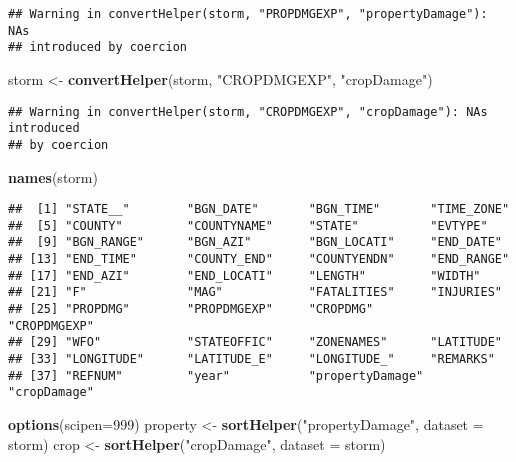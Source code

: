 \documentclass[]{article}
\newenvironment{Shaded}{\begin{snugshade}}{\end{snugshade}}
\newcommand{\KeywordTok}[1]{\textcolor[rgb]{0.13,0.29,0.53}{\textbf{#1}}}
\newcommand{\DataTypeTok}[1]{\textcolor[rgb]{0.13,0.29,0.53}{#1}}
\newcommand{\DecValTok}[1]{\textcolor[rgb]{0.00,0.00,0.81}{#1}}
\newcommand{\StringTok}[1]{\textcolor[rgb]{0.31,0.60,0.02}{#1}}
\newcommand{\NormalTok}[1]{#1}
\begin{document}
\begin{verbatim}
## Warning in convertHelper(storm, "PROPDMGEXP", "propertyDamage"): NAs
## introduced by coercion
\end{verbatim}

\begin{Shaded}
\begin{Highlighting}[]
\NormalTok{storm <-}\StringTok{ }\KeywordTok{convertHelper}\NormalTok{(storm, }\StringTok{"CROPDMGEXP"}\NormalTok{, }\StringTok{"cropDamage"}\NormalTok{)}
\end{Highlighting}
\end{Shaded}

\begin{verbatim}
## Warning in convertHelper(storm, "CROPDMGEXP", "cropDamage"): NAs introduced
## by coercion
\end{verbatim}

\begin{Shaded}
\begin{Highlighting}[]
\KeywordTok{names}\NormalTok{(storm)}
\end{Highlighting}
\end{Shaded}

\begin{verbatim}
##  [1] "STATE__"        "BGN_DATE"       "BGN_TIME"       "TIME_ZONE"     
##  [5] "COUNTY"         "COUNTYNAME"     "STATE"          "EVTYPE"        
##  [9] "BGN_RANGE"      "BGN_AZI"        "BGN_LOCATI"     "END_DATE"      
## [13] "END_TIME"       "COUNTY_END"     "COUNTYENDN"     "END_RANGE"     
## [17] "END_AZI"        "END_LOCATI"     "LENGTH"         "WIDTH"         
## [21] "F"              "MAG"            "FATALITIES"     "INJURIES"      
## [25] "PROPDMG"        "PROPDMGEXP"     "CROPDMG"        "CROPDMGEXP"    
## [29] "WFO"            "STATEOFFIC"     "ZONENAMES"      "LATITUDE"      
## [33] "LONGITUDE"      "LATITUDE_E"     "LONGITUDE_"     "REMARKS"       
## [37] "REFNUM"         "year"           "propertyDamage" "cropDamage"
\end{verbatim}

\begin{Shaded}
\begin{Highlighting}[]
\KeywordTok{options}\NormalTok{(}\DataTypeTok{scipen=}\DecValTok{999}\NormalTok{)}
\NormalTok{property <-}\StringTok{ }\KeywordTok{sortHelper}\NormalTok{(}\StringTok{"propertyDamage"}\NormalTok{, }\DataTypeTok{dataset =}\NormalTok{ storm)}
\NormalTok{crop <-}\StringTok{ }\KeywordTok{sortHelper}\NormalTok{(}\StringTok{"cropDamage"}\NormalTok{, }\DataTypeTok{dataset =}\NormalTok{ storm)}
\end{Highlighting}
\end{Shaded}
\end{document}
